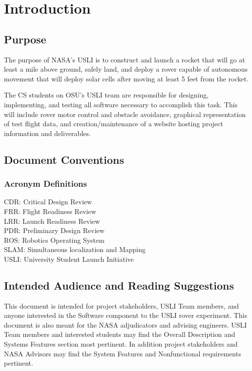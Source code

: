\documentclass{scrreprt}
\begin{document}
\chapter{Introduction}

\section{Purpose}
The purpose of NASA's USLI is to construct and launch a rocket that will go at least a mile above ground, safely land, and deploy a rover capable of autonomous movement that will deploy solar cells after moving at least 5 feet from the rocket.

The CS students on OSU's USLI team are responsible for designing, implementing, and testing all software necessary to accomplish this task. 
			This will include rover motor control and obstacle avoidance, graphical representation of test flight data, and creation/maintenance of a website hosting project information and deliverables.

\section{Document Conventions}
\subsection{Acronym Definitions}
CDR: Critical Design Review \\
FRR: Flight Readiness Review \\
LRR: Launch Readiness Review \\
PDR: Preliminary Design Review\\
ROS: Robotics Operating System\\
SLAM: Simultaneous localization and Mapping\\
USLI: University Student Launch Initiative\\

\section{Intended Audience and Reading Suggestions}
This document is intended for project stakeholders, USLI Team members, and anyone interested in the Software component to the USLI rover experiment. This document is also meant for the NASA adjudicators and advising engineers. USLI Team members and interested students may find the Overall Description and Systems Features section most pertinent. In addition project stakeholders and NASA Advisors may find the System Features and Nonfunctional requirements pertinent.
\end{document}
